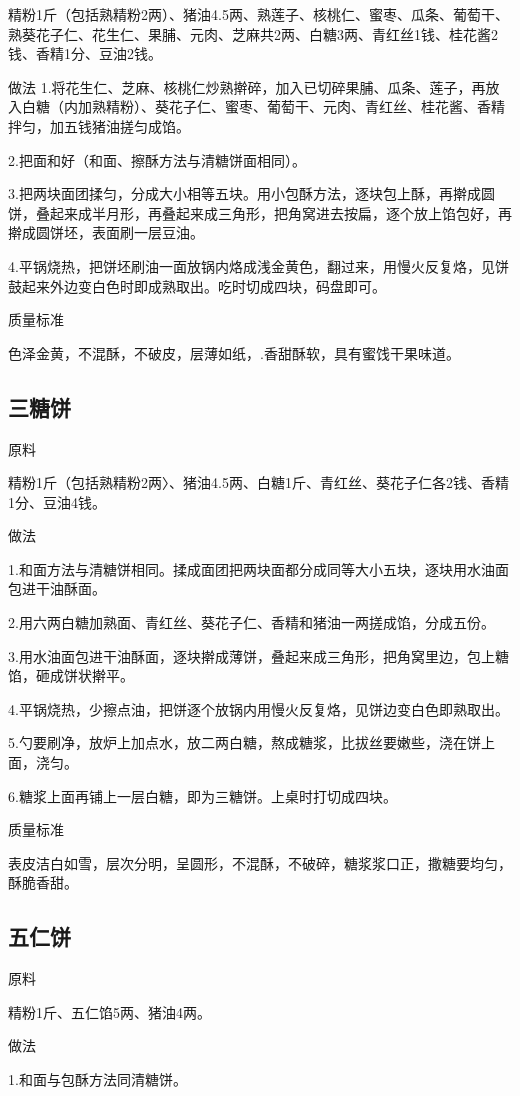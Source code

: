 \documentclass{ctexbook}
\begin{document}
精粉1斤（包括熟精粉2两）、猪油4.5两、熟莲子、核桃仁、蜜枣、瓜条、葡萄干、熟葵花子仁、花生仁、果脯、元肉、芝麻共2两、白糖3两、青红丝1钱、桂花酱2钱、香精1分、豆油2钱。

做法
1.将花生仁、芝麻、核桃仁炒熟擀碎，加入已切碎果脯、瓜条、莲子，再放入白糖（内加熟精粉）、葵花子仁、蜜枣、葡萄干、元肉、青红丝、桂花酱、香精拌匀，加五钱猪油搓匀成馅。

2.把面和好（和面、擦酥方法与清糖饼面相同）。

3.把两块面团揉匀，分成大小相等五块。用小包酥方法，逐块包上酥，再擀成圆饼，叠起来成半月形，再叠起来成三角形，把角窝进去按扁，逐个放上馅包好，再擀成圆饼坯，表面刷一层豆油。

4.平锅烧热，把饼坯刷油一面放锅内烙成浅金黄色，翻过来，用慢火反复烙，见饼鼓起来外边变白色时即成熟取出。吃时切成四块，码盘即可。

质量标准

色泽金黄，不混酥，不破皮，层薄如纸，.香甜酥软，具有蜜饯干果味道。
\subsection{三糖饼}
原料

精粉1斤（包括熟精粉2两〉、猪油4.5两、白糖1斤、青红丝、葵花子仁各2钱、香精1分、豆油4钱。

做法

1.和面方法与清糖饼相同。揉成面团把两块面都分成同等大小五块，逐块用水油面包进干油酥面。

2.用六两白糖加熟面、青红丝、葵花子仁、香精和猪油一两搓成馅，分成五份。

3.用水油面包进干油酥面，逐块擀成薄饼，叠起来成三角形，把角窝里边，包上糖馅，砸成饼状擀平。

4.平锅烧热，少擦点油，把饼逐个放锅内用慢火反复烙，见饼边变白色即熟取出。

5.勺要刷净，放炉上加点水，放二两白糖，熬成糖浆，比拔丝要嫩些，浇在饼上面，浇匀。

6.糖浆上面再铺上一层白糖，即为三糖饼。上桌时打切成四块。

质量标准

表皮洁白如雪，层次分明，呈圆形，不混酥，不破碎，糖浆浆口正，撒糖要均匀，酥脆香甜。
\subsection{五仁饼}
原料

精粉1斤、五仁馅5两、猪油4两。

做法

1.和面与包酥方法同清糖饼。
\end{document}
